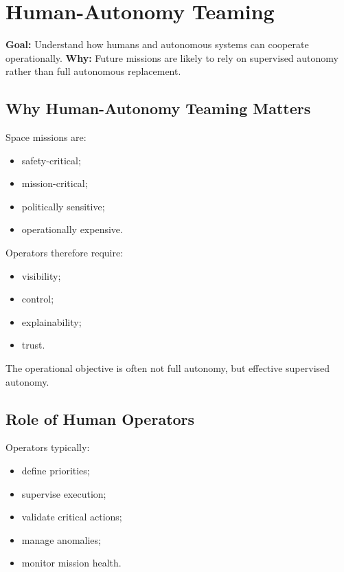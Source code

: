 \documentclass[10pt,a4paper,twocolumn]{article}
\newcommand{\lesson}[3]{
\section{#1}
\noindent
\textbf{Goal:} #2 \newline
\textbf{Why:} #3
\vspace{0.1em}
}
\begin{document}


\lesson
{Human-Autonomy Teaming}
{Understand how humans and autonomous systems can cooperate operationally.}
{Future missions are likely to rely on supervised autonomy rather than full autonomous replacement.}


\subsection{Why Human-Autonomy Teaming Matters}

Space missions are:
\begin{itemize}
    \item safety-critical;
    \item mission-critical;
    \item politically sensitive;
    \item operationally expensive.
\end{itemize}

Operators therefore require:
\begin{itemize}
    \item visibility;
    \item control;
    \item explainability;
    \item trust.
\end{itemize}

\begin{keybox}
    The operational objective is often not full autonomy, but effective supervised autonomy.
\end{keybox}


\subsection{Role of Human Operators}

Operators typically:
\begin{itemize}
    \item define priorities;
    \item supervise execution;
    \item validate critical actions;
    \item manage anomalies;
    \item monitor mission health.
\end{itemize}
\end{document}
